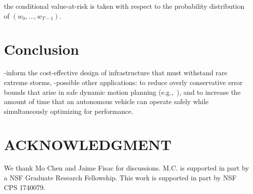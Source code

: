 \documentclass[letterpaper, 10 pt, conference]{ieeeconf}  %
\begin{document}
the conditional value-at-risk is taken with respect to the probability distribution of $(w_0, \dots, w_{T-1})$. 

\section{Conclusion}\label{conclusion}
-inform the cost-effective design of infrastructure that must withstand rare extreme storms,
-possible other applications: to reduce overly conservative error bounds that arise in safe dynamic motion planning (e.g.,~\cite{herbert2017fastrack}), 
and to increase the amount of time that an autonomous vehicle can operate safely while simultaneously optimizing for performance.


\section*{ACKNOWLEDGMENT}
We thank Mo Chen and Jaime Fisac for discussions.
M.C. is supported in part by a NSF Graduate Research Fellowship.
This work is supported in part by NSF CPS 1740079.


\addtolength{\textheight}{-2cm}   %


\end{document}

